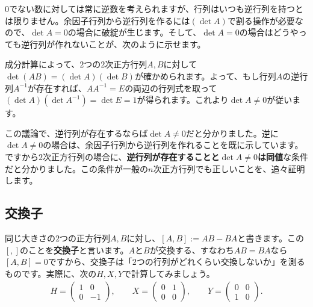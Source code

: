 $0$でない数に対しては常に逆数を考えられますが、行列はいつも逆行列を持つとは限りません。余因子行列から逆行列を作るには$(\det A)$で割る操作が必要なので、$\det A = 0$の場合に破綻が生じます。そして、$\det A = 0$の場合はどうやっても逆行列が作れないことが、次のように示せます。

成分計算によって、$2$つの$2$次正方行列$A, B$に対して$\det (AB) = (\det A)(\det B)$が確かめられます。よって、もし行列$A$の逆行列$A^{-1}$が存在すれば、$A A^{-1} = E$の両辺の行列式を取って$(\det A)(\det A^{-1}) = \det E =1$が得られます。これより$\det A \neq 0$が従います。

この議論で、逆行列が存在するならば$\det A \neq 0$だと分かりました。逆に$\det A \neq 0$の場合は、余因子行列から逆行列を作れることを既に示しています。ですから$2$次正方行列の場合に、\textbf{逆行列が存在することと$\det A \neq 0$は同値}な条件だと分かりました。この条件が一般の$n$次正方行列でも正しいことを、追々証明します。

\subsection{交換子} \label{paragraph:commutator}
同じ大きさの$2$つの正方行列$A, B$に対し、$[A, B] := AB - BA$と書きます。この$[,]$のことを\textbf{交換子}と言います。$A$と$B$が交換する、すなわち$AB = BA$なら$[A, B] = 0$ですから、交換子は「$2$つの行列がどれくらい交換しないか」を測るものです。実際に、次の$H, X, Y$で計算してみましょう。
\begin{align*}
H =
\begin{pmatrix}
1 & 0 \\
0 & -1
\end{pmatrix}, \qquad
X =
\begin{pmatrix}
0 & 1 \\
0 & 0
\end{pmatrix}, \qquad
Y =
\begin{pmatrix}
0 & 0 \\
1 & 0
\end{pmatrix}.
\end{align*}


